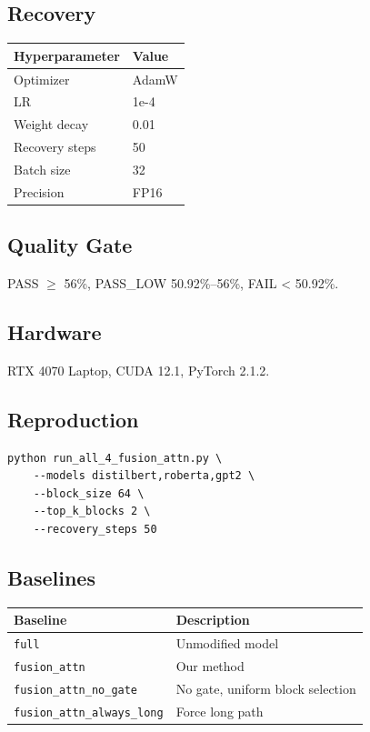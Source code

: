 \subsection{Recovery}

\begin{table}[H]
\centering
\small
\begin{tabular}{ll}
\toprule
\textbf{Hyperparameter} & \textbf{Value} \\
\midrule
Optimizer & AdamW \\
LR & 1e-4 \\
Weight decay & 0.01 \\
Recovery steps & 50 \\
Batch size & 32 \\
Precision & FP16 \\
\bottomrule
\end{tabular}
\end{table}

\subsection{Quality Gate}

PASS $\ge$ 56\%, PASS\_LOW 50.92\%--56\%, FAIL < 50.92\%.

\subsection{Hardware}

RTX 4070 Laptop, CUDA 12.1, PyTorch 2.1.2.

\subsection{Reproduction}

\begin{lstlisting}
python run_all_4_fusion_attn.py \
    --models distilbert,roberta,gpt2 \
    --block_size 64 \
    --top_k_blocks 2 \
    --recovery_steps 50
\end{lstlisting}

\subsection{Baselines}

\begin{table}[H]
\centering
\small
\begin{tabular}{ll}
\toprule
\textbf{Baseline} & \textbf{Description} \\
\midrule
\texttt{full} & Unmodified model \\
\texttt{fusion\_attn} & Our method \\
\texttt{fusion\_attn\_no\_gate} & No gate, uniform block selection \\
\texttt{fusion\_attn\_always\_long} & Force long path \\
\bottomrule
\end{tabular}
\end{table}



